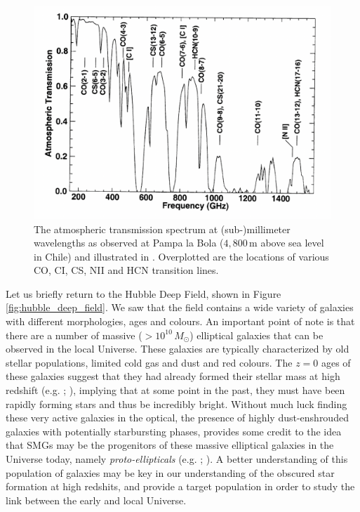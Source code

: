 \begin{figure}
    \centering
	\includegraphics[angle=0.5, width=0.75\columnwidth]{Figures/transmission.pdf}
	\caption[Atmospheric transmission of (sub-) mm wavelengths from Pampa la Bola]{The atmospheric transmission spectrum at (sub-)millimeter wavelengths as observed at Pampa la Bola ($4,800\,$m above sea level in Chile) and illustrated in \citealt{Matsushita_2000}. Overplotted are the locations of various CO, CI, CS, NII and HCN transition lines.}
	\label{fig:transmission}
\end{figure}

Let us briefly return to the Hubble Deep Field, shown in Figure \ref{fig:hubble_deep_field}. We saw that the field contains a wide variety of galaxies with different morphologies, ages and colours. An important point of note is that there are a number of massive ($>10^{10}\,M_\odot$) elliptical galaxies that can be observed in the local Universe. These galaxies are typically characterized by old stellar populations, limited cold gas and dust and red colours. The $z = 0$ ages of these galaxies suggest that they had already formed their stellar mass at high redshift (e.g. \citealt{Gallazzi_2005}; \citealt{Thomas_2005}), implying that at some point in the past, they must have been rapidly forming stars and thus be incredibly bright. Without much luck finding these very active galaxies in the optical, the presence of highly dust-enshrouded galaxies with potentially starbursting phases, provides some credit to the idea that SMGs may be the progenitors of these massive elliptical galaxies in the Universe today, namely \textit{proto-ellipticals} (e.g. \citealt{Toft_2014}; \citealt{Valentino_2020b}). A better understanding of this population of galaxies may be key in our understanding of the obscured star formation at high redshits, and provide a target population in order to study the link between the early and local Universe.

